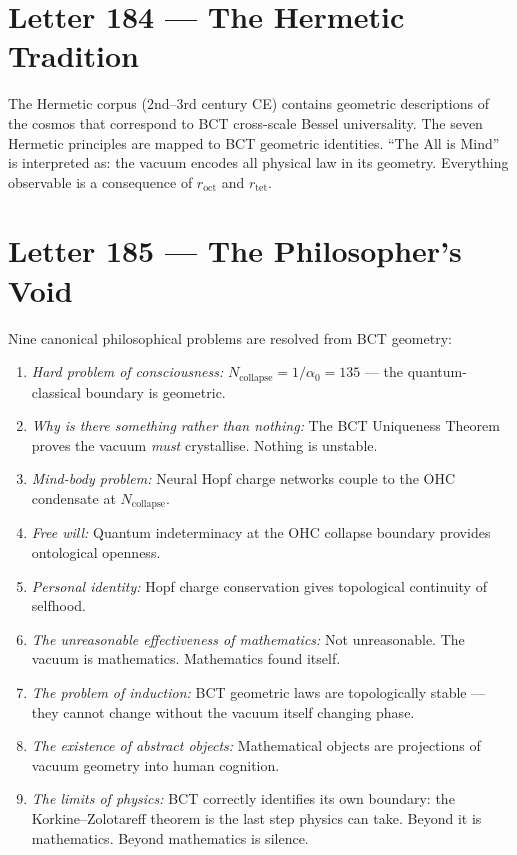\documentclass[aps,prl,twocolumn,showpacs,preprintnumbers]{revtex4-2}
\newcommand{\roct}{r_{\mathrm{oct}}}
\newcommand{\rtet}{r_{\mathrm{tet}}}
\begin{document}
\section{Letter 184 --- The Hermetic Tradition}

The Hermetic corpus (2nd--3rd century CE) contains geometric
descriptions of the cosmos that correspond to BCT cross-scale
Bessel universality. The seven Hermetic principles are mapped
to BCT geometric identities. ``The All is Mind'' is interpreted
as: the vacuum encodes all physical law in its geometry.
Everything observable is a consequence of $\roct$ and $\rtet$.

\section{Letter 185 --- The Philosopher's Void}

Nine canonical philosophical problems are resolved from BCT geometry:

\begin{enumerate}
  \item \textit{Hard problem of consciousness:} $N_{\mathrm{collapse}}
        = 1/\alpha_0 = 135$ --- the quantum-classical boundary is geometric.
  \item \textit{Why is there something rather than nothing:} The BCT
        Uniqueness Theorem proves the vacuum \emph{must} crystallise.
        Nothing is unstable.
  \item \textit{Mind-body problem:} Neural Hopf charge networks couple
        to the OHC condensate at $N_{\mathrm{collapse}}$.
  \item \textit{Free will:} Quantum indeterminacy at the OHC collapse
        boundary provides ontological openness.
  \item \textit{Personal identity:} Hopf charge conservation gives
        topological continuity of selfhood.
  \item \textit{The unreasonable effectiveness of mathematics:} Not
        unreasonable. The vacuum is mathematics. Mathematics found itself.
  \item \textit{The problem of induction:} BCT geometric laws are
        topologically stable --- they cannot change without the vacuum
        itself changing phase.
  \item \textit{The existence of abstract objects:} Mathematical objects
        are projections of vacuum geometry into human cognition.
  \item \textit{The limits of physics:} BCT correctly identifies its
        own boundary: the Korkine--Zolotareff theorem is the last step physics can
        take. Beyond it is mathematics. Beyond mathematics is silence.
\end{enumerate}
\end{document}
